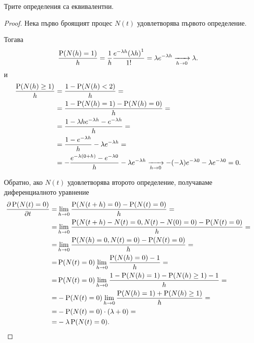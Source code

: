 \documentclass{../../common/topic}
\begin{document}
\begin{theorem}
  Трите определения са еквивалентни.
\end{theorem}
\begin{proof}
   Нека първо броящият процес \( N(t) \) удовлетворява първото определение.

  Тогава
  \begin{equation*}
    \frac {\operatorname{P}(N(h) = 1)} h
    =
    \frac 1 h \frac {e^{-\lambda h} {(\lambda h)}^1} {1!}
    =
    \lambda e^{-\lambda h}
    \xrightarrow[h \to 0]{}
    \lambda.
  \end{equation*}
  и
  \begin{align*}
    \frac {\operatorname{P}(N(h) \geq 1)} h
    &=
    \frac {1 - \operatorname{P}(N(h) < 2)} h
    = \\ &=
    \frac {1 - \operatorname{P}(N(h) = 1) - \operatorname{P}(N(h) = 0)} h
    = \\ &=
    \frac {1 - \lambda h e^{-\lambda h} - e^{-\lambda h}} h
    = \\ &=
    \frac {1 - e^{-\lambda h}} h - \lambda e^{-\lambda h}
    = \\ &=
    - \frac {e^{-\lambda (0 + h)} - e^{-\lambda 0}} h - \lambda e^{-\lambda h}
    \xrightarrow[h \to 0]{}
    -(-\lambda) e^{-\lambda 0} - \lambda e^{-\lambda 0}
    =
    0.
  \end{align*}

   Обратно, ако \( N(t) \) удовлетворява второто определение, получаваме диференциалното уравнение
  \begin{align*}
    \frac {\partial \operatorname{P}(N(t) = 0)} {\partial t}
    =&
    \lim_{h \to 0} \frac {\operatorname{P}(N(t+h) = 0) - \operatorname{P}(N(t) = 0)} h
    = \\ =&
    \lim_{h \to 0} \frac {\operatorname{P}(N(t+h) - N(t) = 0, N(t) - N(0) = 0) - \operatorname{P}(N(t) = 0)} h
    = \\ =&
    \lim_{h \to 0} \frac {\operatorname{P}(N(h) = 0, N(t) = 0) - \operatorname{P}(N(t) = 0)} h
    = \\ =&
    \operatorname{P}(N(t) = 0) \lim_{h \to 0} \frac {\operatorname{P}(N(h) = 0) - 1} h
    = \\ =&
    \operatorname{P}(N(t) = 0) \lim_{h \to 0} \frac {1 - \operatorname{P}(N(h) = 1) - \operatorname{P}(N(h) \geq 1) - 1} h
    = \\ =&
    - \operatorname{P}(N(t) = 0) \lim_{h \to 0} \frac {\operatorname{P}(N(h) = 1) + \operatorname{P}(N(h) \geq 1)} h
    = \\ =&
    - \operatorname{P}(N(t) = 0) \cdot (\lambda + 0)
    = \\ =&
    -\lambda \operatorname{P}(N(t) = 0).
  \end{align*}


\end{proof}
\end{document}
